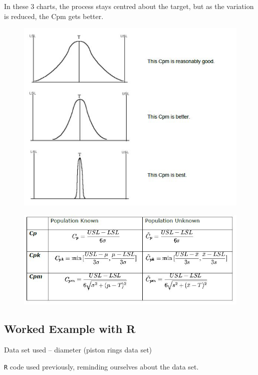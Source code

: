 \documentclass[11pt]{article} %
\begin{document}
			
\noindent  In these 3 charts, the process stays centred about the target, but as the variation is reduced, the Cpm gets better.
			\begin{figure}[h!]
				\centering
				\includegraphics[width=0.8\linewidth]{proccapindices/image7}
			\end{figure}
			
			\begin{figure}[h!]
				\centering
				\includegraphics[width=0.8\linewidth]{proccapindices/formulas}
			\end{figure}
			
			\newpage
			\subsection{Worked Example with R}
			
			Data set used – diameter (piston rings data set)
			
			\texttt{R} code used previously, reminding ourselves about the data set.
			
\end{document}

